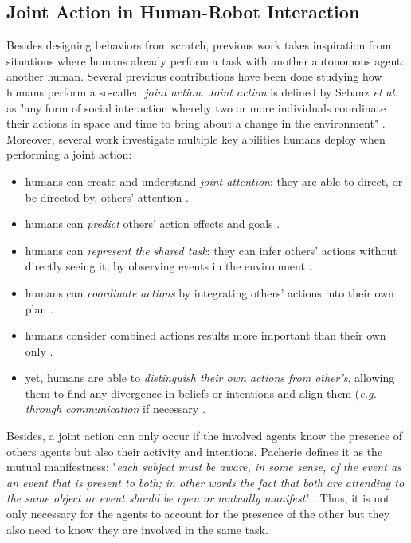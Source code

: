 \documentclass[a4paper,11pt,twoside]{StyleThese}
\begin{document}
\subsection{Joint Action in Human-Robot Interaction}

Besides designing behaviors from scratch, previous work takes inspiration from situations where humans already perform a task with another autonomous agent: another human. Several previous contributions have been done studying how humans perform a so-called \textit{joint action}. \textit{Joint action} is defined by Sebanz \textit{et al.} as "any form of social interaction whereby two or more individuals coordinate their actions in space and time to bring about a change in the environment" \cite{sebanz2006joint}. Moreover, several work investigate multiple key abilities humans deploy when performing a joint action:
\begin{itemize}
\item humans can create and understand \textit{joint attention}: they are able to direct, or be directed by, others' attention \cite{pacherie_phenomenology_2011, sebanz2006joint}.
\item humans can \textit{predict} others' action effects and goals \cite{tomasello2005understanding, sebanz2006joint}.
\item humans can \textit{represent the shared task}: they can infer others' actions without directly seeing it, by observing events in the environment \cite{knoblich2011psychological, sebanz2006joint}.
\item humans can \textit{coordinate actions} by integrating others' actions into their own plan \cite{sebanz2006joint}.
\item humans consider combined actions results more important than their own only \cite{sebanz2006joint}.
\item yet, humans are able to \textit{distinguish their own actions from other's}, allowing them to find any divergence in beliefs or intentions and align them (\textit{e.g. through communication} if necessary \cite{pacherie_phenomenology_2011}.
\end{itemize}

Besides, a joint action can only occur if the involved agents know the presence of others agents but also their activity and intentions. Pacherie defines it as the mutual manifestness: "\textit{each subject must be aware, in some sense, of the event as an event that is present to both; in other words the fact that both are attending to the same object or event should be open or mutually manifest}" \cite{pacherie_phenomenology_2011}. Thus, it is not only necessary for the agents to account for the presence of the other but they also need to know they are involved in the same task.
\end{document}

